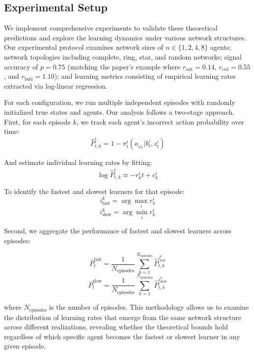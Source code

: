 \subsection{Experimental Setup}

We implement comprehensive experiments to validate these theoretical predictions and explore the learning dynamics under various network structures. Our experimental protocol examines network sizes of $n \in \{1, 2, 4, 8\}$ agents; network topologies including complete, ring, star, and random networks; signal accuracy of $p = 0.75$ (matching the paper's example where $r_{\text{aut}} = 0.14$, $r_{\text{crd}} = 0.55$, and $r_{\text{bdd}} = 1.10$); and learning metrics consisting of empirical learning rates extracted via log-linear regression.

For each configuration, we run multiple independent episodes with randomly initialized true states and agents. Our analysis follows a two-stage approach. First, for each episode $k$, we track each agent's incorrect action probability over time: 
\begin{equation}
    \hat{P}_{t,k}^i = 1 - \pi_t^i(a_{\omega_k} | b^i_t, z^i_t)
\end{equation}

And estimate individual learning rates by fitting: 
\begin{equation}
    \log \hat{P}_{t,k}^i \approx -r_k^i t + c_k^i
\end{equation}

To identify the fastest and slowest learners for that episode: 
\begin{equation}
    i_{\text{fast}}^k = \arg\max_i r_k^i
\end{equation} 
 \begin{equation}
    i_{\text{slow}}^k = \arg\min_i r_k^i
\end{equation}

Second, we aggregate the performance of fastest and slowest learners across episodes:

\begin{equation}
    \bar{P}_t^{\text{fast}} = \frac{1}{N_{\text{episodes}}} \sum_{k=1}^{N_{\text{episodes}}} \hat{P}_{t,k}^{i_{\text{fast}}^k}
\end{equation}
\begin{equation}
    \bar{P}_t^{\text{slow}} = \frac{1}{N_{\text{episodes}}} \sum_{k=1}^{N_{\text{episodes}}} \hat{P}_{t,k}^{i_{\text{slow}}^k}
\end{equation}

where $N_{\text{episodes}}$ is the number of episodes. This methodology allows us to examine the distribution of learning rates that emerge from the same network structure across different realizations, revealing whether the theoretical bounds hold regardless of which specific agent becomes the fastest or slowest learner in any given episode.

